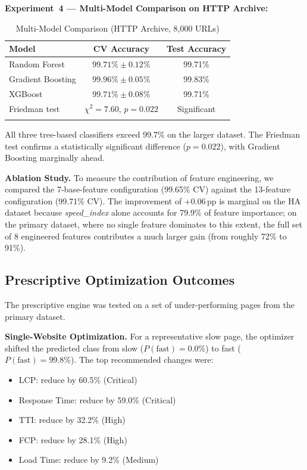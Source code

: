 \documentclass[sn-nature]{sn-jnl}
\begin{document}
\textbf{Experiment~4 --- Multi-Model Comparison on HTTP Archive:}

\begin{table}[htbp]
\caption{Multi-Model Comparison (HTTP Archive, 8,000 URLs)}\label{tab:ha_models}
\centering
\begin{tabular}{l c c}
\toprule
Model & CV Accuracy & Test Accuracy \\
\midrule
Random Forest & $99.71\% \pm 0.12\%$ & 99.71\% \\
Gradient Boosting & $99.96\% \pm 0.05\%$ & 99.83\% \\
XGBoost & $99.71\% \pm 0.08\%$ & 99.71\% \\
Friedman test & $\chi^2 = 7.60$, $p = 0.022$ & Significant \\
\botrule
\end{tabular}
\end{table}

All three tree-based classifiers exceed 99.7\% on the larger dataset. The Friedman test confirms a statistically significant difference ($p = 0.022$), with Gradient Boosting marginally ahead.

\textbf{Ablation Study.} To measure the contribution of feature engineering, we compared the 7-base-feature configuration (99.65\% CV) against the 13-feature configuration (99.71\% CV). The improvement of +0.06\,pp is marginal on the HA dataset because \textit{speed\_index} alone accounts for 79.9\% of feature importance; on the primary dataset, where no single feature dominates to this extent, the full set of 8 engineered features contributes a much larger gain (from roughly 72\% to 91\%).

\subsection{Prescriptive Optimization Outcomes}

The prescriptive engine was tested on a set of under-performing pages from the primary dataset.

\textbf{Single-Website Optimization.} For a representative slow page, the optimizer shifted the predicted class from slow ($P(\text{fast}) = 0.0\%$) to fast ($P(\text{fast}) = 99.8\%$). The top recommended changes were:
\begin{itemize}
    \item LCP: reduce by 60.5\% (Critical)
    \item Response Time: reduce by 59.0\% (Critical)
    \item TTI: reduce by 32.2\% (High)
    \item FCP: reduce by 28.1\% (High)
    \item Load Time: reduce by 9.2\% (Medium)
\end{itemize}
\end{document}

